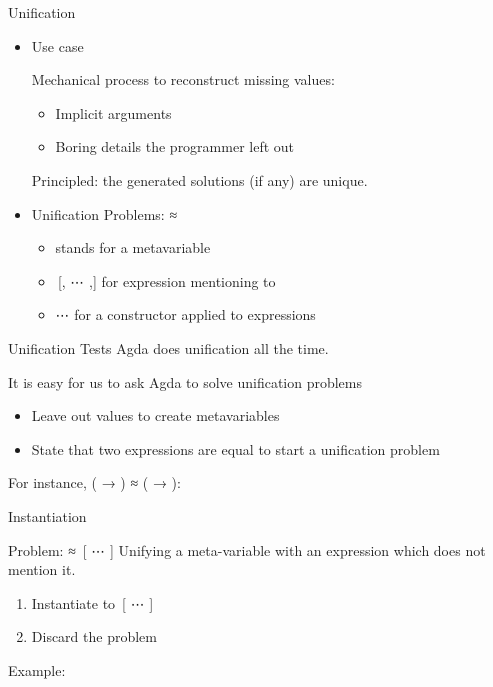 \documentclass[compress,9pt]{beamer}
\begin{document}
\begin{frame}{Unification}

  \begin{itemize}
    \item Use case\medskip

    Mechanical process to reconstruct missing values:
    \begin{itemize}
      \item Implicit arguments
      \item Boring details the programmer left out
    \end{itemize}

    Principled: the generated solutions (if any) are unique.

    \bigskip

    \item Unification Problems: { ≈ }\medskip

    \begin{itemize}
      \item {} stands for a metavariable
      \item {\,[, ⋯ ,]} for expression  mentioning  to 
      \item {  ⋯  for a} constructor  applied to  expressions
    \end{itemize}

  \end{itemize}
\end{frame}

\begin{frame}{Unification Tests}
  Agda does unification all the time.\medskip

  It is easy for us to ask Agda to solve unification problems

  \begin{itemize}
    \item Leave out values to create metavariables
    \item State that two expressions are equal to start a unification problem
  \end{itemize}

  \bigskip
  For instance, {( → ) ≈ ( → )}:


\end{frame}

\begin{frame}{Instantiation}
  \begin{alertblock}{Problem: { ≈ \,[ ⋯ ]}}
    Unifying a meta-variable with an expression which does not mention it.
  \end{alertblock}

  \bigskip
  \begin{enumerate}
    \item Instantiate  to {\,[ ⋯ ]}
    \item Discard the problem
  \end{enumerate}

  \bigskip Example:
\end{frame}
\end{document}
